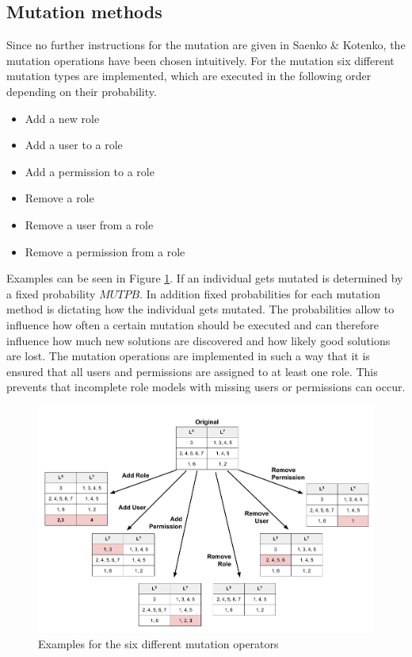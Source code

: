         \subsection{Mutation methods}
        Since no further instructions for the mutation are given in Saenko \& Kotenko\cite{saenko2012design}, the mutation operations have been chosen intuitively. For the mutation six different mutation types are implemented, which are executed in the following order depending on their probability.
        \begin{itemize}
            \setlength{\itemsep}{1pt}
            \item Add a new role
            \item Add a user to a role
            \item Add a permission to a role
            \item Remove a role
            \item Remove a user from a role
            \item Remove a permission from a role
        \end{itemize}
        Examples can be seen in Figure \ref{fig:mutationOperations}. If an individual gets mutated is determined by a fixed probability $MUTPB$. In addition fixed probabilities for each mutation method is dictating how the individual gets mutated. The probabilities allow to influence how often a certain mutation should be executed and can therefore influence how much new solutions are discovered and how likely good solutions are lost. The mutation operations are implemented in such a way that it is ensured that all users and permissions are assigned to at least one role. This prevents that incomplete role models with missing users or permissions can occur.

        \begin{figure}[H]
            \centering
            \includegraphics[scale=0.27]{./Figures/Mutations}
            \caption{Examples for the six different mutation operators}
            \label{fig:mutationOperations}
        \end{figure}
